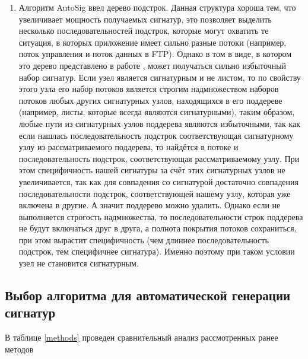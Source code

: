 \begin{enumerate}
    \item
    Алгоритм AutoSig ввел дерево подстрок.
    Данная структура хороша тем, что увеличивает мощность получаемых сигнатур,
    это позволяет выделить несколько последовательностей подстрок, которые могут охватить те ситуация, в которых
    приложение имеет сильно разные потоки (например, поток управления и поток данных в FTP).
    Однако в том в виде, в котором это дерево представлено в работе \cite{ye2009autosig}, может получаться сильно избыточный набор сигнатур.
    Если узел является сигнатурным и не листом, то по свойству этого узла его набор потоков является строгим надмножеством
    наборов потоков любых других сигнатурных узлов, находящихся в его поддереве (например, листы, которые всегда являются сигнатурными),
    таким образом, любые пути из сигнатурных узлов поддерева являются избыточными, так как если нашлась последовательность подстрок
    соответствующая сигнатурному узлу из рассматриваемого поддерева,
    то найдётся в потоке и последовательность подстрок, соответствующая рассматриваемому узлу.
    При этом специфичность нашей сигнатуры за счёт этих сигнатурных узлов не увеличивается,
    так как для совпадения со сигнатурой достаточно совпадения последовательности подстрок,
    соответствующей нашему узлу, которая уже включена в другие.
    А значит поддерево можно удалить. Однако если не выполняется строгость надмножества, то последовательности строк
    поддерева не будут включаться друг в друга, а полнота покрытия потоков сохраниться,
    при этом вырастит специфичность (чем длиннее последовательность подстрок, тем специфичнее сигнатура).
    Именно поэтому при таком условии узел не становится сигнатурным.
\end{enumerate}

\subsection{Выбор алгоритма для автоматической генерации сигнатур}

В таблице \ref{methods} проведен сравнительный анализ рассмотренных ранее методов

